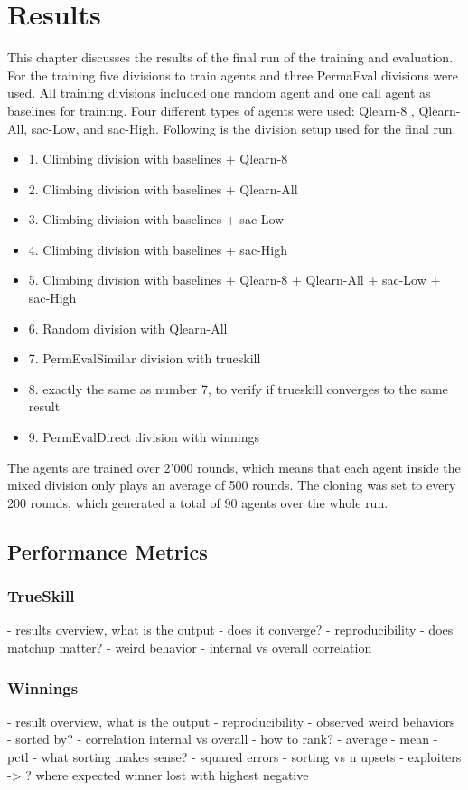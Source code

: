 \chapter{Results}
This chapter discusses the results of the final run of the training and evaluation. For the training five divisions to train agents and three  PermaEval divisions were used. All training divisions included one random agent and one call agent as baselines for training. Four different types of agents were used: Qlearn-8 , Qlearn-All, sac-Low, and sac-High. Following is the division setup used for the final run.
\begin{itemize}
    \item 1. Climbing division with baselines + Qlearn-8
    \item 2. Climbing division with baselines + Qlearn-All
    \item 3. Climbing division with baselines + sac-Low
    \item 4. Climbing division with baselines + sac-High
    \item 5. Climbing division with baselines + Qlearn-8 + Qlearn-All + sac-Low + sac-High
    \item 6. Random division with Qlearn-All
    \item 7. PermEvalSimilar division with trueskill
    \item 8. exactly the same as number 7, to verify if trueskill converges to the same result
    \item 9. PermEvalDirect division with winnings
\end{itemize}
The agents are trained over 2'000 rounds, which means that each agent inside the mixed division only plays an average of 500 rounds. The cloning was set to every 200 rounds, which generated a total of 90 agents over the whole run.


\section{Performance Metrics}


\subsection{TrueSkill}
- results overview, what is the output
- does it converge?
- reproducibility
- does matchup matter?
- weird behavior
- internal vs overall correlation


\subsection{Winnings}
- result overview, what is the output
- reproducibility
- observed weird behaviors
- sorted by?
- correlation internal vs overall
- how to rank?
 - average
 - mean
 - pctl
- what sorting makes sense?
 - squared errors
- sorting vs n upsets
- exploiters -> ? where expected winner lost with highest negative


